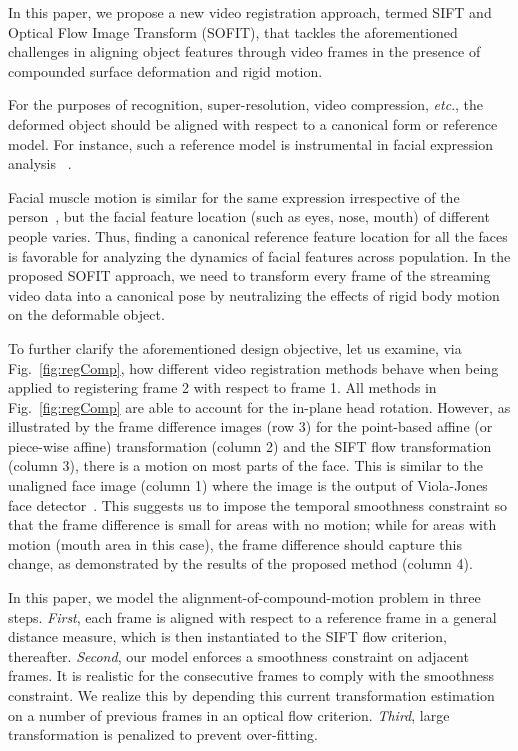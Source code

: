 \documentclass[10pt,journal]{IEEEtran}
\begin{document}
In this paper, we propose a new video registration approach, termed SIFT and Optical Flow Image Transform (SOFIT), that tackles the aforementioned challenges in aligning object features through video frames in the presence of compounded surface deformation and rigid motion.

For the purposes of recognition, super-resolution, video compression, \textit{etc}., the deformed object should be aligned with respect to a canonical form or reference model.
For instance, such a reference model is instrumental in facial expression analysis ~\cite{Yang_SMCB12}.

Facial muscle motion is similar for the same expression irrespective of the person~\cite{Ekman78}, but the facial feature location (such as eyes, nose, mouth) of different people varies. Thus, finding a canonical reference feature location for all the faces is favorable for analyzing the dynamics of facial features across population. In the proposed SOFIT approach, we need to transform every frame of the streaming video data into a canonical pose by neutralizing the effects of rigid body motion on the deformable object.

To further clarify the aforementioned design objective, let us examine, via Fig.~\ref{fig:regComp}, how different video registration methods behave when being applied to registering frame 2 with respect to frame 1.  All methods in Fig.~\ref{fig:regComp} are able to account for the in-plane head rotation. However, as illustrated by the frame difference images (row 3) for the point-based affine (or piece-wise affine) transformation (column 2) and the SIFT flow transformation (column 3), there is a motion on most parts of the face. This is similar to the unaligned face image (column 1) where the image is the output of Viola-Jones face detector~\cite{Viola_IJCV04}. This suggests us to impose the temporal smoothness constraint so that the frame difference is small for areas with no motion; while for areas with motion (mouth area in this case), the frame difference should capture this change, as demonstrated by the results of the proposed method (column 4).

In this paper, we model the alignment-of-compound-motion problem in three steps. \textit{First}, each frame is aligned with respect to a reference frame in a general distance measure, which is then instantiated to the SIFT flow criterion, thereafter. \textit{Second}, our model enforces a smoothness constraint on adjacent frames. It is realistic for the consecutive frames to comply with the smoothness constraint. We realize this by depending this current transformation estimation on a number of previous frames in an optical flow criterion. \textit{Third}, large transformation is penalized to prevent over-fitting. 
\end{document}
